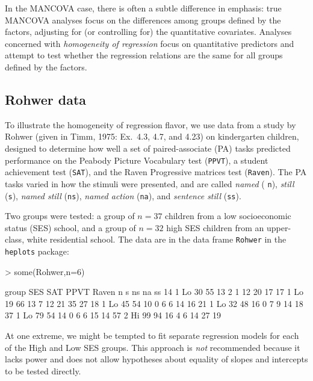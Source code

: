 \documentclass[11pt]{article}
\begin{document}
In the MANCOVA case,
there is often a subtle difference in emphasis:  true MANCOVA analyses focus on
the differences among groups defined by the factors, adjusting for 
(or controlling for) the quantitative covariates. Analyses concerned
with \emph{homogeneity of regression} focus on quantitative predictors
and attempt to test whether the regression relations are the same for
all groups defined by the factors.

\subsection{Rohwer data}

To illustrate the homogeneity of regression flavor,
we use data
from a study by Rohwer (given in Timm, 1975: Ex.\ 4.3, 4.7, and 4.23)\nocite%
{Timm:75} on kindergarten children, designed to determine how well a set of
paired-associate (PA) tasks predicted performance on the Peabody Picture
Vocabulary test (\texttt{PPVT}), a student achievement test (\texttt{SAT}),
and the Raven Progressive matrices test (\texttt{Raven}). The PA tasks
varied in how the stimuli were presented, and are called \emph{named} (%
\texttt{n}), \emph{still} (\texttt{s}), \emph{named still} (\texttt{ns}), 
\emph{named action} (\texttt{na}), and \emph{sentence still} (\texttt{ss}).

Two groups were tested: a group of $n=37$ children from a low socioeconomic
status (SES) school, and a group of $n=32$ high SES children from an
upper-class, white residential school. The data are in the data frame 
\texttt{Rohwer} in the \texttt{heplots} package:
\begin{Schunk}
\begin{Sinput}
> some(Rohwer,n=6)
\end{Sinput}
\begin{Soutput}
   group SES SAT PPVT Raven n  s ns na ss
14     1  Lo  30   55    13 2  1 12 20 17
17     1  Lo  19   66    13 7 12 21 35 27
18     1  Lo  45   54    10 0  6  6 14 16
21     1  Lo  32   48    16 0  7  9 14 18
37     1  Lo  79   54    14 0  6  6 15 14
57     2  Hi  99   94    16 4  6 14 27 19
\end{Soutput}
\end{Schunk}

At one extreme, we might be tempted to fit separate regression models for each
of the High and Low SES groups.  This approach is \emph{not} recommended because it
lacks power and does not allow hypotheses about equality of slopes and intercepts
to be tested directly.
\end{document}
